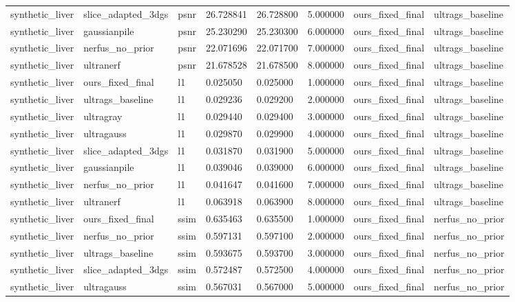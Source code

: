 \begin{tabular}{llllllll}
synthetic\_liver & slice\_adapted\_3dgs & psnr & 26.728841 & 26.728800 & 5.000000 & ours\_fixed\_final & ultrags\_baseline \\
synthetic\_liver & gaussianpile & psnr & 25.230290 & 25.230300 & 6.000000 & ours\_fixed\_final & ultrags\_baseline \\
synthetic\_liver & nerfus\_no\_prior & psnr & 22.071696 & 22.071700 & 7.000000 & ours\_fixed\_final & ultrags\_baseline \\
synthetic\_liver & ultranerf & psnr & 21.678528 & 21.678500 & 8.000000 & ours\_fixed\_final & ultrags\_baseline \\
synthetic\_liver & ours\_fixed\_final & l1 & 0.025050 & 0.025000 & 1.000000 & ours\_fixed\_final & ultrags\_baseline \\
synthetic\_liver & ultrags\_baseline & l1 & 0.029236 & 0.029200 & 2.000000 & ours\_fixed\_final & ultrags\_baseline \\
synthetic\_liver & ultragray & l1 & 0.029440 & 0.029400 & 3.000000 & ours\_fixed\_final & ultrags\_baseline \\
synthetic\_liver & ultragauss & l1 & 0.029870 & 0.029900 & 4.000000 & ours\_fixed\_final & ultrags\_baseline \\
synthetic\_liver & slice\_adapted\_3dgs & l1 & 0.031870 & 0.031900 & 5.000000 & ours\_fixed\_final & ultrags\_baseline \\
synthetic\_liver & gaussianpile & l1 & 0.039046 & 0.039000 & 6.000000 & ours\_fixed\_final & ultrags\_baseline \\
synthetic\_liver & nerfus\_no\_prior & l1 & 0.041647 & 0.041600 & 7.000000 & ours\_fixed\_final & ultrags\_baseline \\
synthetic\_liver & ultranerf & l1 & 0.063918 & 0.063900 & 8.000000 & ours\_fixed\_final & ultrags\_baseline \\
synthetic\_liver & ours\_fixed\_final & ssim & 0.635463 & 0.635500 & 1.000000 & ours\_fixed\_final & nerfus\_no\_prior \\
synthetic\_liver & nerfus\_no\_prior & ssim & 0.597131 & 0.597100 & 2.000000 & ours\_fixed\_final & nerfus\_no\_prior \\
synthetic\_liver & ultrags\_baseline & ssim & 0.593675 & 0.593700 & 3.000000 & ours\_fixed\_final & nerfus\_no\_prior \\
synthetic\_liver & slice\_adapted\_3dgs & ssim & 0.572487 & 0.572500 & 4.000000 & ours\_fixed\_final & nerfus\_no\_prior \\
synthetic\_liver & ultragauss & ssim & 0.567031 & 0.567000 & 5.000000 & ours\_fixed\_final & nerfus\_no\_prior \\

\end{tabular}
